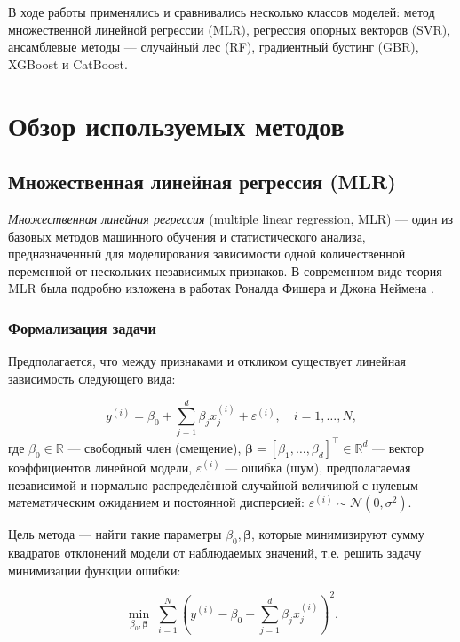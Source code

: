 В ходе работы применялись и сравнивались несколько классов моделей: метод множественной линейной регрессии (MLR), регрессия опорных векторов (SVR), ансамблевые методы --- случайный лес (RF), градиентный бустинг (GBR), XGBoost и CatBoost.

\section{Обзор используемых методов} \label{ch1:methods}
\subsection{Множественная линейная регрессия (MLR)}

\textit{Множественная линейная регрессия} (multiple linear regression, MLR) --- один из базовых методов машинного обучения и статистического анализа, предназначенный для моделирования зависимости одной количественной переменной от нескольких независимых признаков. В современном виде теория MLR была подробно изложена в работах Роналда Фишера и Джона Неймена \cite{fisher1922, rao1973}.

\subsubsection{Формализация задачи}

Предполагается, что между признаками и откликом существует линейная зависимость следующего вида:

\begin{equation}
y^{(i)} = \beta_0 + \sum_{j=1}^{d} \beta_j x_j^{(i)} + \varepsilon^{(i)}, \quad i = 1, \ldots, N,
\end{equation}
где $\beta_0 \in \mathbb{R}$ --- свободный член (смещение), $\boldsymbol{\beta} = [\beta_1, \ldots, \beta_d]^\top \in \mathbb{R}^d$ --- вектор коэффициентов линейной модели, $\varepsilon^{(i)}$ --- ошибка (шум), предполагаемая независимой и нормально распределённой случайной величиной с нулевым математическим ожиданием и постоянной дисперсией: $\varepsilon^{(i)} \sim \mathcal{N}(0, \sigma^2)$.

Цель метода --- найти такие параметры $\beta_0, \boldsymbol{\beta}$, которые минимизируют сумму квадратов отклонений модели от наблюдаемых значений, т.е. решить задачу минимизации функции ошибки:

\begin{equation}
\min_{\beta_0, \boldsymbol{\beta}} \; \sum_{i=1}^N \left( y^{(i)} - \beta_0 - \sum_{j=1}^d \beta_j x_j^{(i)} \right)^2.
\end{equation}

